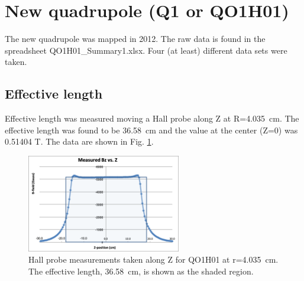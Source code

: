 \documentclass[12pt]{article}
\begin{document}
\section{New quadrupole (Q1 or QO1H01)}
The new quadrupole was mapped in 2012. The raw data is found in the spreadsheet QO1H01\_Summary1.xlsx. Four (at least) different data sets were taken.

\subsection{Effective length}
Effective length was measured moving a Hall probe along Z at R=4.035~cm. The effective length was found to be 36.58~cm and the value at the center (Z=0) was 0.51404 T. The data are shown in Fig. \ref{fig:Q1_eff_len}.
\begin{figure}[!h]
\centering
\includegraphics[width=0.6\textwidth]{QO1H01_Eff_Len.png}
\caption{\label{fig:Q1_eff_len}Hall probe measurements taken along Z for QO1H01 at r=4.035~cm. The effective length, 36.58~cm, is shown as the shaded region.}
\end{figure}
\end{document}
